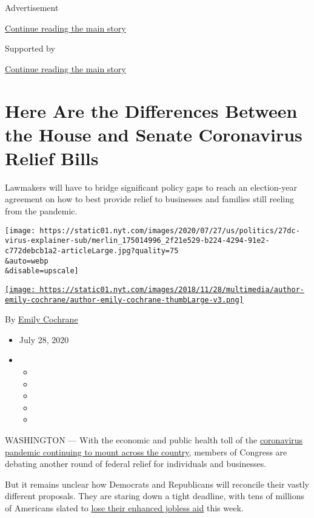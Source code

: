 Advertisement

\protect\hyperlink{after-top}{Continue reading the main story}

Supported by

\protect\hyperlink{after-sponsor}{Continue reading the main story}

\hypertarget{here-are-the-differences-between-the-house-and-senate-coronavirus-relief-bills}{%
\section{Here Are the Differences Between the House and Senate
Coronavirus Relief
Bills}\label{here-are-the-differences-between-the-house-and-senate-coronavirus-relief-bills}}

Lawmakers will have to bridge significant policy gaps to reach an
election-year agreement on how to best provide relief to businesses and
families still reeling from the pandemic.

\texttt{[image: https://static01.nyt.com/images/2020/07/27/us/politics/27dc-virus-explainer-sub/merlin\_175014996\_2f21e529-b224-4294-91e2-c772debcb1a2-articleLarge.jpg?quality=75\\\&auto=webp\\\&disable=upscale]}

\href{https://www.nytimes.com/by/emily-cochrane}{\texttt{[image: https://static01.nyt.com/images/2018/11/28/multimedia/author-emily-cochrane/author-emily-cochrane-thumbLarge-v3.png]}}

By \href{https://www.nytimes.com/by/emily-cochrane}{Emily Cochrane}

\begin{itemize}
\item
  July 28, 2020
\item
  \begin{itemize}
  \item
  \item
  \item
  \item
  \item
  \end{itemize}
\end{itemize}

WASHINGTON --- With the economic and public health toll of the
\href{https://www.nytimes.com/interactive/2020/us/coronavirus-us-cases.html}{coronavirus
pandemic continuing to mount across the country}, members of Congress
are debating another round of federal relief for individuals and
businesses.

But it remains unclear how Democrats and Republicans will reconcile
their vastly different proposals. They are staring down a tight
deadline, with tens of millions of Americans slated to
\href{https://www.nytimes.com/2020/07/21/business/economy/coronavirus-unemployment-benefits.html}{lose
their enhanced jobless aid} this week.

